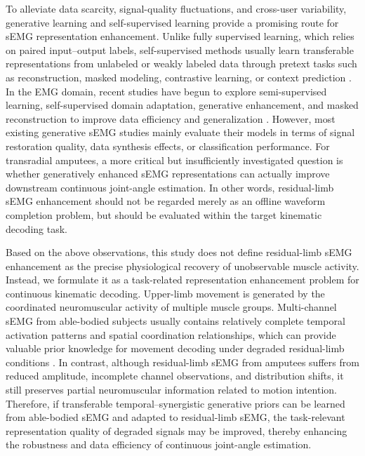 \documentclass[journal]{IEEEtran}
\begin{document}
To alleviate data scarcity, signal-quality fluctuations, and cross-user variability, generative learning and self-supervised learning provide a promising route for sEMG representation enhancement. Unlike fully supervised learning, which relies on paired input--output labels, self-supervised methods usually learn transferable representations from unlabeled or weakly labeled data through pretext tasks such as reconstruction, masked modeling, contrastive learning, or context prediction \cite{Zhong2026DeepFeature,He2022MAE}. In the EMG domain, recent studies have begun to explore semi-supervised learning, self-supervised domain adaptation, generative enhancement, and masked reconstruction to improve data efficiency and generalization \cite{Zhong2026DeepFeature,Wang2025TrustEMG,Wang2023Iterative,Duan2023EMGSense,Raghu2024SelfSupervised}. However, most existing generative sEMG studies mainly evaluate their models in terms of signal restoration quality, data synthesis effects, or classification performance. For transradial amputees, a more critical but insufficiently investigated question is whether generatively enhanced sEMG representations can actually improve downstream continuous joint-angle estimation. In other words, residual-limb sEMG enhancement should not be regarded merely as an offline waveform completion problem, but should be evaluated within the target kinematic decoding task.

Based on the above observations, this study does not define residual-limb sEMG enhancement as the precise physiological recovery of unobservable muscle activity. Instead, we formulate it as a task-related representation enhancement problem for continuous kinematic decoding. Upper-limb movement is generated by the coordinated neuromuscular activity of multiple muscle groups. Multi-channel sEMG from able-bodied subjects usually contains relatively complete temporal activation patterns and spatial coordination relationships, which can provide valuable prior knowledge for movement decoding under degraded residual-limb conditions \cite{Zhong2026DeepFeature,Zhong2023STGCN,Lee2023Stretchable}. In contrast, although residual-limb sEMG from amputees suffers from reduced amplitude, incomplete channel observations, and distribution shifts, it still preserves partial neuromuscular information related to motion intention. Therefore, if transferable temporal--synergistic generative priors can be learned from able-bodied sEMG and adapted to residual-limb sEMG, the task-relevant representation quality of degraded signals may be improved, thereby enhancing the robustness and data efficiency of continuous joint-angle estimation.
\end{document}
